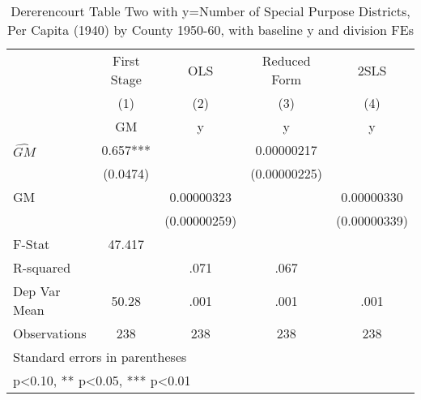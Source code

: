 \begin{table}[htbp]\centering
\def\sym#1{\ifmmode^{#1}\else\(^{#1}\)\fi}
\caption{Dererencourt Table Two with y=Number of Special Purpose Districts, Per Capita (1940) by County 1950-60, with baseline y and division FEs}
\begin{tabular}{l*{4}{c}}
\toprule
                    & First Stage   &         OLS   &Reduced Form   &        2SLS   \\
                    &\multicolumn{1}{c}{(1)}&\multicolumn{1}{c}{(2)}&\multicolumn{1}{c}{(3)}&\multicolumn{1}{c}{(4)}\\
                    &\multicolumn{1}{c}{GM}&\multicolumn{1}{c}{y}&\multicolumn{1}{c}{y}&\multicolumn{1}{c}{y}\\
\midrule
$\hat{GM}$          &       0.657***&               &  0.00000217   &               \\
                    &    (0.0474)   &               &(0.00000225)   &               \\
\addlinespace
GM                  &               &  0.00000323   &               &  0.00000330   \\
                    &               &(0.00000259)   &               &(0.00000339)   \\
\midrule
F-Stat              &      47.417   &               &               &               \\
R-squared           &               &        .071   &        .067   &               \\
Dep Var Mean        &       50.28   &        .001   &        .001   &        .001   \\
Observations        &         238   &         238   &         238   &         238   \\
\bottomrule
\multicolumn{5}{l}{\footnotesize Standard errors in parentheses}\\
\multicolumn{5}{l}{\footnotesize * p<0.10, ** p<0.05, *** p<0.01}\\
\end{tabular}
\end{table}
